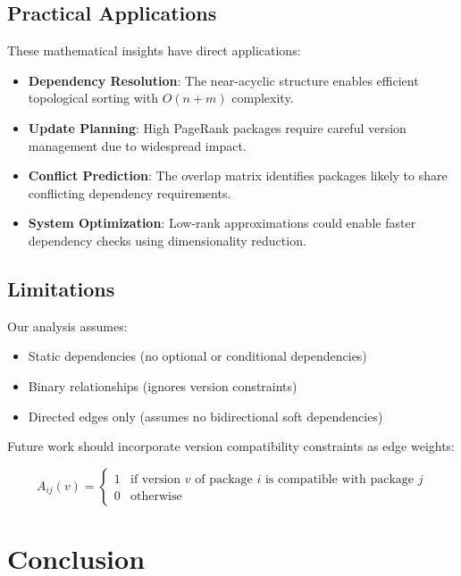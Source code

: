 \documentclass[11pt,a4paper]{article}
\begin{document}
\subsection{Practical Applications}

These mathematical insights have direct applications:

\begin{itemize}
\item \textbf{Dependency Resolution}: The near-acyclic structure enables efficient topological sorting with $O(n + m)$ complexity.

\item \textbf{Update Planning}: High PageRank packages require careful version management due to widespread impact.

\item \textbf{Conflict Prediction}: The overlap matrix identifies packages likely to share conflicting dependency requirements.

\item \textbf{System Optimization}: Low-rank approximations could enable faster dependency checks using dimensionality reduction.
\end{itemize}

\subsection{Limitations}

Our analysis assumes:
\begin{itemize}
\item Static dependencies (no optional or conditional dependencies)
\item Binary relationships (ignores version constraints)
\item Directed edges only (assumes no bidirectional soft dependencies)
\end{itemize}

Future work should incorporate version compatibility constraints as edge weights:

\begin{equation}
A_{ij}(v) = \begin{cases}
1 & \text{if version } v \text{ of package } i \text{ is compatible with package } j \\
0 & \text{otherwise}
\end{cases}
\end{equation}

\section{Conclusion}
\end{document}
